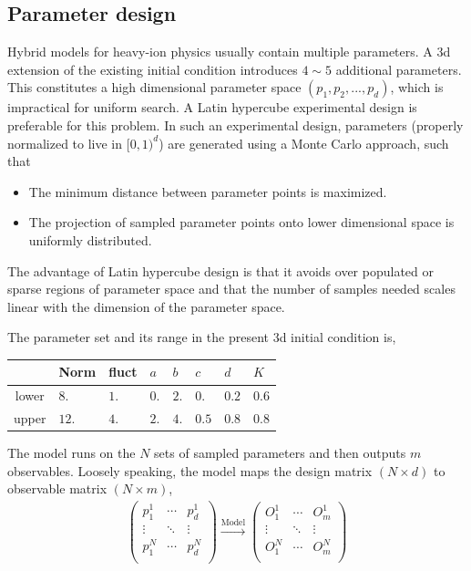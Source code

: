 \documentclass[aps,prl,twocolumn,groupedaddress]{revtex4-1}
\begin{document}
	\subsection{Parameter design} 
	Hybrid models for heavy-ion physics usually contain multiple parameters. 
	A 3d extension of the existing initial condition introduces $4\sim5$ additional parameters.
	This constitutes a high dimensional parameter space $(p_1, p_2, ..., p_d)$, which is impractical for uniform search. 
	A Latin hypercube experimental design is preferable for this problem. 
	In such an experimental design, parameters (properly normalized to live in $[0,1)^d$) are generated using a Monte Carlo approach, such that
	\begin{itemize}
		\item The minimum distance between parameter points is maximized.
		\item The projection of sampled parameter points onto lower dimensional space is uniformly distributed.
	\end{itemize}
	The advantage of Latin hypercube design is that it avoids over populated or sparse regions of parameter space and that the number of samples needed scales linear with the dimension of the parameter space.
	
	The parameter set and its range in the present 3d initial condition is,
	\begin{center}
	\begin{tabularx}{0.45\textwidth}{c*{7}{Y}}
		\toprule[1pt]
		 & Norm	& fluct	& $a$ & $b$ & $c$ & $d$ & $K$ \\
		\midrule[0.5pt]
		lower & $8.$		&  $1.$	&	$0.$&	 $2.$ & $0.$ & $0.2$ & $0.6$ \\
		upper	& $12.$		&  $4.$	&	$2.$& $4.$ & $0.5$ & $0.8$ & $0.8$ \\
		\bottomrule[1pt]
	\end{tabularx}\label{parameter}
	\end{center}
	The model runs on the $N$ sets of sampled parameters and then outputs $m$ observables. Loosely speaking, the model maps the design matrix $(N \times d)$ to observable matrix $(N \times m)$,
	\begin{eqnarray}\label{design-obs}
	\left(\begin{array}{ccc}
	p_{1}^{1}  & \cdots & p_{d}^{1}\\
	\vdots  & \ddots & \vdots\\
	p_{1}^{N}  & \cdots & p_{d}^{N}\\
	\end{array}\right)
	\xrightarrow{\textrm{Model}} 
	\left(\begin{array}{ccc}
	O_{1}^{1}  & \cdots & O_{m}^{1}\\
	\vdots  & \ddots & \vdots\\
	O_{1}^{N}  & \cdots & O_{m}^{N}\\
	\end{array}\right)
	\end{eqnarray}
	
\end{document}

